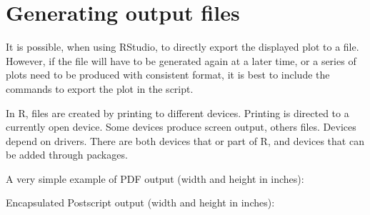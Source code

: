 \documentclass[paper=a4,10pt,div=17,headsepline,BCOR=12mm,twoside,open=right]{scrbook}\usepackage{knitr}
\begin{document}
\section{Generating output files}

It is possible, when using RStudio, to directly export the displayed plot to a file. However, if the file will have to be generated again at a later time, or a series of plots need to be produced with consistent format, it is best to include the commands to export the plot in the script.

In R, files are created by printing to different devices. Printing is directed to a currently open device. Some devices produce screen output, others files. Devices depend on drivers. There are both devices that or part of R, and devices that can be added through packages.

A very simple example of PDF output (width and height in inches):

\begin{knitrout}\footnotesize
{}\color{fgcolor}\begin{kframe}
\begin{alltt}
 \hlkwb{<-} \hlstd{(}\hlstd{(}\hlstd{=}\hlopt{-}\hlopt{:}\hlstd{),} \hlstd{(} \hlopt{+}
  \hlstd{(}
\hlstd{(}\hlstd{=}\hlstd{,} \hlstd{=}\hlstd{,} \hlstd{=}\hlstd{)}
\hlstd{()}
\end{alltt}
\end{kframe}
\end{knitrout}

Encapsulated Postscript output (width and height in inches):

\begin{knitrout}\footnotesize
{}\color{fgcolor}\begin{kframe}
\begin{alltt}
\hlstd{(}\hlstd{=}\hlstd{,} \hlstd{=}\hlstd{,} \hlstd{=}\hlstd{)}
\hlstd{()}
\end{alltt}
\end{kframe}
\end{knitrout}
\end{document}
